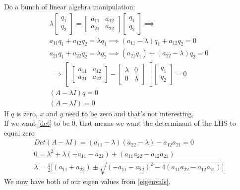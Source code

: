 \documentclass{article}
\begin{document}
Do a bunch of linear algebra manipulation: 
\begin{align}
    \lambda \begin{bmatrix}
        q_1\\
        q_2
\end{bmatrix} = \begin{bmatrix}
    a_{11} & a_{12}\\
    a_{21} & a_{22} 
\end{bmatrix} 
\begin{bmatrix}
        q_1\\
        q_2
\end{bmatrix} \implies \\
a_{11} q_1 + a_{12} q_2 = \lambda q_1 \implies  (a_{11} - \lambda) q_1 + a_{12} q_2 = 0 \\
a_{21} q_1 + a_{22} q_2 = \lambda q_2 \implies (a_{21} q_1) + (a_{22} - \lambda) q_2 = 0\\
\implies \begin{bmatrix}
    \begin{bmatrix}
        a_{11} & a_{12} \\
        a_{21} & a_{22}
    \end{bmatrix} - \begin{bmatrix}
        \lambda & 0 \\
        0 & \lambda
    \end{bmatrix}
\end{bmatrix} \begin{bmatrix}
    q_1 \\
    q_2
\end{bmatrix} = 0 \\
(A - \lambda I) q = 0 \label{vector} \\
(A - \lambda I) = 0 \label{det}
\end{align}
If $q$ is zero, $x$ and $y$ need to be zero and that's not interesting. \\

If we want \ref{det} to be 0, that means we want the determinant of the LHS to equal zero 
\begin{align}
    Det(A - \lambda I) = (a_{11} - \lambda)(a_{22} - \lambda) - a_{12} a_{21} = 0 \\
    0 = \lambda^2 + \lambda (-a_{11} - a_{22}) + (a_{11}a_{22} - a_{12}a_{21}) \label{solution} \\
    \lambda = \frac{1}{2} \Bigg[(a_{11} + a_{22}) \pm \sqrt{(-a_{11} - a_{22})^2 - 4 (a_{11}a_{22} - a_{12} a_{21})}\Bigg] \label{eigenvals}
\end{align}
We now have both of our eigen values from \ref{eigenvals}. \\
\end{document}
